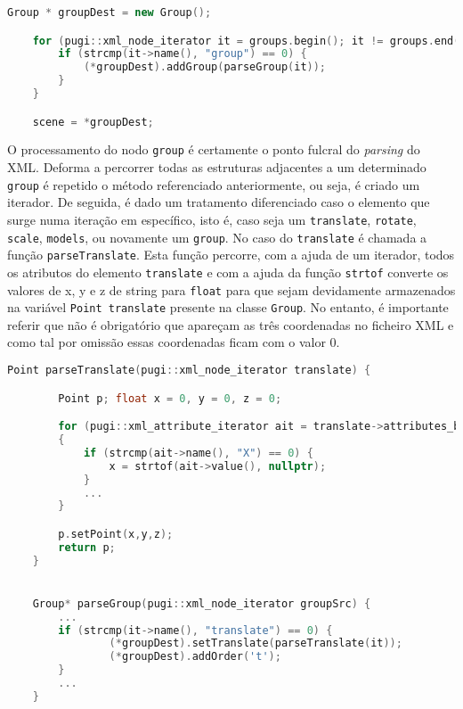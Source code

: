 \documentclass[a4paper]{article}
\begin{document}
\begin{lstlisting}[language=C++, caption=Adição de um novo nodo \texttt{group}.]
    Group * groupDest = new Group();

    for (pugi::xml_node_iterator it = groups.begin(); it != groups.end(); ++it) {
        if (strcmp(it->name(), "group") == 0) {
            (*groupDest).addGroup(parseGroup(it)); 
        }
    }

    scene = *groupDest;
\end{lstlisting}

O processamento do nodo \texttt{group} é certamente o ponto fulcral do \textit{parsing} do XML. Deforma a percorrer todas as estruturas adjacentes a um determinado \texttt{group} é repetido o método referenciado anteriormente, ou seja, é criado um iterador. De seguida, é dado um tratamento diferenciado caso o elemento que surge numa iteração em específico, isto é, caso seja um \texttt{translate}, \texttt{rotate}, \texttt{scale}, \texttt{models}, ou novamente um \texttt{group}. No caso do \texttt{translate} é chamada a função \texttt{parseTranslate}. Esta função percorre, com a ajuda de um iterador, todos os atributos do elemento \texttt{translate} e com a ajuda da função \texttt{strtof} converte os valores de x, y e z de string para \texttt{float} para que sejam devidamente armazenados na variável \texttt{Point translate} presente na classe \texttt{Group}. No entanto, é importante referir que não é obrigatório que apareçam as três coordenadas no ficheiro XML e como tal por omissão essas coordenadas ficam com o valor 0.

\begin{lstlisting}[language=C++, caption=\textit{Parse} do nodo \texttt{translate} e consequente carregamento para a estrutura de dados.]
    Point parseTranslate(pugi::xml_node_iterator translate) {

        Point p; float x = 0, y = 0, z = 0;

        for (pugi::xml_attribute_iterator ait = translate->attributes_begin(); ait != translate->attributes_end(); ++ait)
        {
            if (strcmp(ait->name(), "X") == 0) {
                x = strtof(ait->value(), nullptr);
            }
            ...
        }

        p.setPoint(x,y,z);
        return p;
    }


    Group* parseGroup(pugi::xml_node_iterator groupSrc) {
        ...
        if (strcmp(it->name(), "translate") == 0) {
                (*groupDest).setTranslate(parseTranslate(it));
                (*groupDest).addOrder('t');
        }
        ...
    }
\end{lstlisting}
\end{document}
